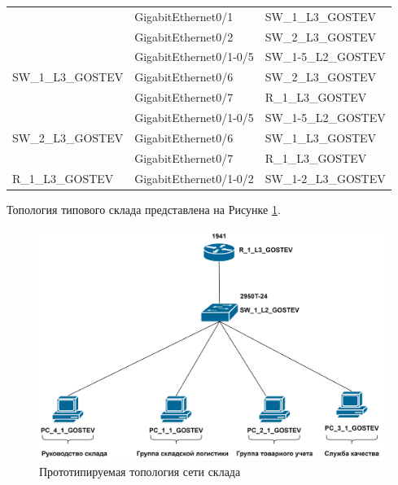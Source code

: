 \documentclass[14pt, a4paper]{extarticle}
\numberwithin{equation}{section}
\begin{document}
\begin{table}[H]
\begin{tabular}{|l|l|l|}
                                   & GigabitEthernet0/1     & SW\_1\_L3\_GOSTEV             \\ \cline{2-3} 
                                   & GigabitEthernet0/2     & SW\_2\_L3\_GOSTEV             \\ \hline
\multirow{3}{*}{SW\_1\_L3\_GOSTEV} & GigabitEthernet0/1-0/5 & SW\_1-5\_L2\_GOSTEV           \\ \cline{2-3} 
                                   & GigabitEthernet0/6     & SW\_2\_L3\_GOSTEV             \\ \cline{2-3} 
                                   & GigabitEthernet0/7     & R\_1\_L3\_GOSTEV              \\ \hline
\multirow{3}{*}{SW\_2\_L3\_GOSTEV} & GigabitEthernet0/1-0/5 & SW\_1-5\_L2\_GOSTEV           \\ \cline{2-3} 
                                   & GigabitEthernet0/6     & SW\_1\_L3\_GOSTEV             \\ \cline{2-3} 
                                   & GigabitEthernet0/7     & R\_1\_L3\_GOSTEV              \\ \hline
R\_1\_L3\_GOSTEV                   & GigabitEthernet0/1-0/2 & SW\_1-2\_L3\_GOSTEV           \\ \hline
\end{tabular}
\end{table}



Топология типового склада представлена на Рисунке \ref{fig:warehouseTopo}.
\begin{figure}[H]
        \centering
        \includegraphics[scale=0.2]{topo_warehouse.png}
        \caption{Прототипируемая топология сети склада}
        \label{fig:warehouseTopo}
\end{figure}
\end{document}

